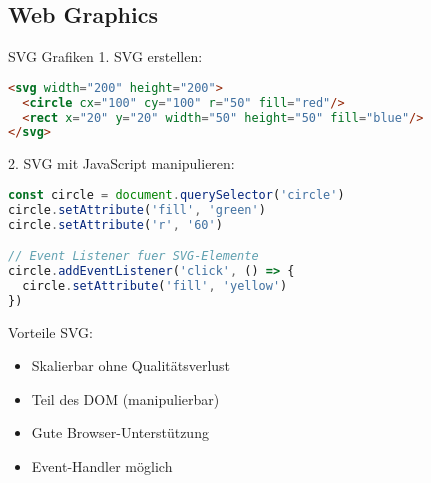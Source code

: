 \subsection{Web Graphics}

\begin{KR}{SVG Grafiken}
1. SVG erstellen:
\begin{lstlisting}[language=HTML, style=basesmol]
<svg width="200" height="200">
  <circle cx="100" cy="100" r="50" fill="red"/>
  <rect x="20" y="20" width="50" height="50" fill="blue"/>
</svg>
\end{lstlisting}

2. SVG mit JavaScript manipulieren:
\begin{lstlisting}[language=JavaScript, style=basesmol]
const circle = document.querySelector('circle')
circle.setAttribute('fill', 'green')
circle.setAttribute('r', '60')

// Event Listener fuer SVG-Elemente
circle.addEventListener('click', () => {
  circle.setAttribute('fill', 'yellow')
})
\end{lstlisting}

Vorteile SVG:
\begin{itemize}
  \item Skalierbar ohne Qualitätsverlust
  \item Teil des DOM (manipulierbar)
  \item Gute Browser-Unterstützung
  \item Event-Handler möglich
\end{itemize}
\end{KR}

